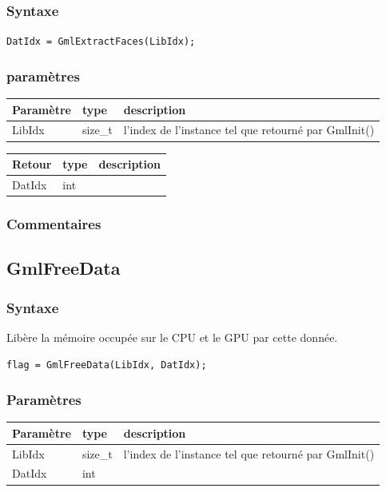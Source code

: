 \documentclass[a4paper,12pt]{article}
\begin{document}
\subsubsection*{Syntaxe}

{\tt DatIdx = GmlExtractFaces(LibIdx);}

\subsubsection*{paramètres}

\begin{tabular}{|m{2cm}|m{1.5cm}|m{10.5cm}|}
\hline
Paramètre  & type    & description \\
\hline
LibIdx     & size\_t & l'index de l'instance tel que retourné par GmlInit() \\
\hline
\end{tabular}

\medskip

\begin{tabular}{|m{2cm}|m{1.5cm}|m{10.5cm}|}
\hline
Retour     & type   & description \\
\hline
DatIdx     & int    & \\
\hline
\end{tabular}

\subsubsection*{Commentaires}


\subsection{GmlFreeData}

\subsubsection*{Syntaxe}

Libère la mémoire occupée sur le CPU et le GPU par cette donnée.

{\tt flag = GmlFreeData(LibIdx, DatIdx);}

\subsubsection*{Paramètres}

\begin{tabular}{|m{2cm}|m{1.5cm}|m{10.5cm}|}
\hline
Paramètre  & type    & description \\
\hline
LibIdx     & size\_t & l'index de l'instance tel que retourné par GmlInit() \\
\hline
DatIdx     & int     & \\
\hline
\end{tabular}
\end{document}
